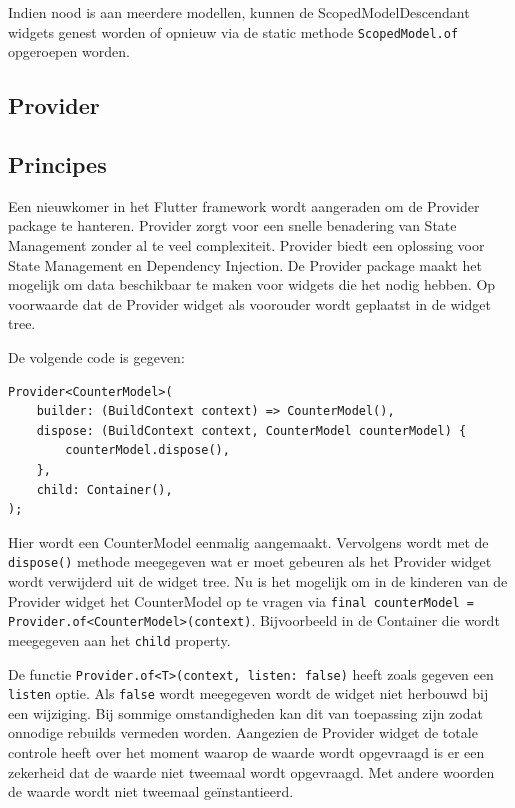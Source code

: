 Indien nood is aan meerdere modellen, kunnen de ScopedModelDescendant widgets genest worden of opnieuw via de static methode \verb|ScopedModel.of| opgeroepen worden.

\subsection{Provider}
\subsection*{Principes}
Een nieuwkomer in het Flutter framework wordt aangeraden om de Provider package te hanteren. Provider zorgt voor een snelle benadering van State Management zonder al te veel complexiteit. Provider biedt een oplossing voor State Management en Dependency Injection.
De Provider package maakt het mogelijk om data beschikbaar te maken voor widgets die het nodig hebben. Op voorwaarde dat de Provider widget als voorouder wordt geplaatst in de widget tree.

De volgende code is gegeven:
\begin{verbatim}
Provider<CounterModel>(
    builder: (BuildContext context) => CounterModel(),
    dispose: (BuildContext context, CounterModel counterModel) {
        counterModel.dispose(),
    },
    child: Container(),
);
\end{verbatim}

Hier wordt een CounterModel eenmalig aangemaakt. Vervolgens wordt met de \verb|dispose()| methode meegegeven wat er moet gebeuren als het Provider widget wordt verwijderd uit de widget tree. Nu is het mogelijk om in de kinderen van de Provider widget het CounterModel op te vragen via \verb|final counterModel = Provider.of<CounterModel>(context)|.
Bijvoorbeeld in de Container die wordt meegegeven aan het \verb|child| property.

De functie \verb|Provider.of<T>(context, listen: false)| heeft zoals gegeven een \verb|listen| optie. Als \verb|false| wordt meegegeven wordt de widget niet herbouwd bij een wijziging. Bij sommige omstandigheden kan dit van toepassing zijn zodat onnodige rebuilds vermeden worden. Aangezien de Provider widget de totale controle heeft over het moment waarop de waarde wordt opgevraagd is er een zekerheid dat de waarde niet tweemaal wordt opgevraagd. Met andere woorden de waarde wordt niet tweemaal geïnstantieerd.

